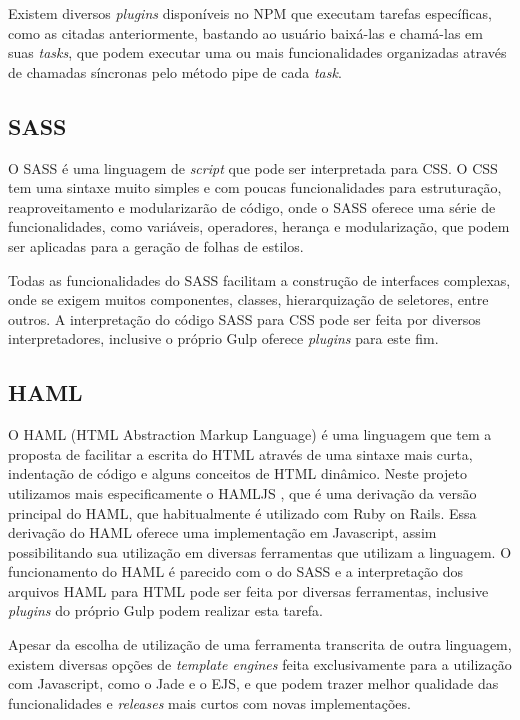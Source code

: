 Existem diversos \textit{plugins} disponíveis no NPM que executam tarefas específicas, como as citadas anteriormente, bastando ao usuário baixá-las e chamá-las em suas \textit{tasks}, que podem executar uma ou mais funcionalidades organizadas através de chamadas síncronas pelo método pipe de cada \textit{task}.

\subsection{SASS}
O SASS \cite{sass} é uma linguagem de \textit{script} que pode ser interpretada para CSS. O CSS tem uma sintaxe muito simples e com poucas funcionalidades para estruturação, reaproveitamento e modularizarão de código, onde o SASS oferece uma série de funcionalidades, como variáveis, operadores, herança e modularização, que podem ser aplicadas para a geração de folhas de estilos.

Todas as funcionalidades do SASS facilitam a construção de interfaces complexas, onde se exigem muitos componentes, classes, hierarquização de seletores, entre outros. A interpretação do código SASS para CSS pode ser feita por diversos interpretadores, inclusive o próprio Gulp oferece \textit{plugins} para este fim.

\subsection{HAML}
O HAML (HTML Abstraction Markup Language) \cite{haml} é uma linguagem que tem a proposta de facilitar a escrita do HTML através de uma sintaxe mais curta, indentação de código e alguns conceitos de HTML dinâmico. Neste projeto utilizamos mais especificamente o HAMLJS \cite{hamljs}, que é uma derivação da versão principal do HAML, que habitualmente é utilizado com Ruby on Rails. Essa derivação do HAML oferece uma implementação em Javascript, assim possibilitando sua utilização em diversas ferramentas que utilizam a linguagem. O funcionamento do HAML é parecido com o do SASS e a interpretação dos arquivos HAML para HTML pode ser feita por diversas ferramentas, inclusive \textit{plugins} do próprio Gulp podem realizar esta tarefa.

Apesar da escolha de utilização de uma ferramenta transcrita de outra linguagem, existem diversas opções de \textit{template engines} feita exclusivamente para a utilização com Javascript, como o Jade e o EJS, e que podem trazer melhor qualidade das funcionalidades e \textit{releases} mais curtos com novas implementações.

